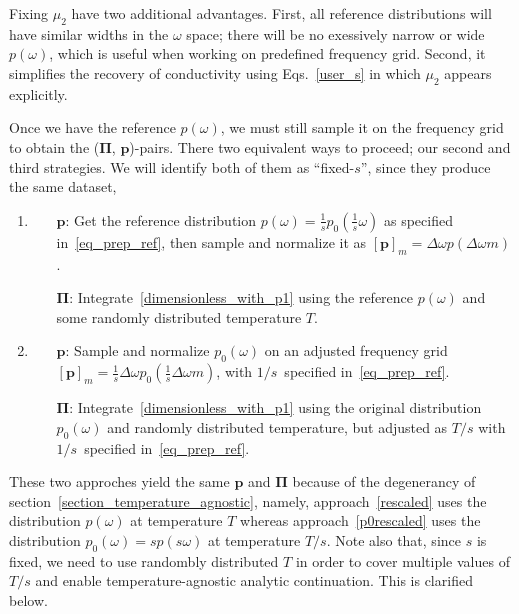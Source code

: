 \documentclass[notitlepage, 11pt, nofootinbib]{revtex4-1}
\renewcommand{\vec}[1]{\bm{#1}}
\begin{document}
Fixing $\mu_2$ have two additional advantages. First, all reference distributions will have similar widths in the $\omega$ space; there will be no exessively narrow or wide $p(\omega)$, which is useful when working on predefined frequency grid. Second, it simplifies the recovery of conductivity using Eqs.~\eqref{user_s} in which $\mu_2$ appears explicitly.

Once we have the reference $p(\omega)$, we must still sample it on the frequency grid to obtain the ($\vec \Pi$, $\vec p$)-pairs. There two equivalent ways to proceed; our second and third strategies. We will identify both of them as ``fixed-$s$'', since they produce the same dataset,
\begin{enumerate}[resume]
\item \label{rescaled}
\begin{itemize}
    \item[$\vec p$:] Get the reference distribution $p(\omega) = \tfrac{1}{s}p_0(\tfrac{1}{s}\omega)$ as specified in~\eqref{eq_prep_ref}, then sample and normalize it as $[\vec p]_m = \Delta\omega p(\Delta\omega m)$.
    \item[$\vec \Pi$:] Integrate~\eqref{dimensionless_with_p1} using the reference $p(\omega)$ and some randomly distributed temperature $T$.
\end{itemize}
\item \label{p0rescaled}
\begin{itemize}
    \item[$\vec p$:] Sample and normalize $p_0(\omega)$ on an adjusted frequency grid $[\vec p]_m = \frac{1}{s}\Delta\omega p_0(\frac{1}{s}\Delta\omega m)$, with $1/s$~specified in~\eqref{eq_prep_ref}.

    \item[$\vec \Pi$:] Integrate~\eqref{dimensionless_with_p1} using the original distribution $p_0(\omega)$ and randomly distributed temperature, but adjusted as $T/s$ with $1/s$~specified in~\eqref{eq_prep_ref}.
\end{itemize}
\end{enumerate}
These two approches yield the same $\vec p$ and $\vec \Pi$ because of the degenerancy of section~\ref{section_temperature_agnostic}, namely, approach~\ref{rescaled} uses the distribution $p(\omega)$ at temperature $T$ whereas approach~\ref{p0rescaled} uses the distribution $p_0(\omega)=sp(s\omega)$ at temperature $T/s$.
Note also that, since $s$ is fixed, we need to use randombly distributed $T$ in order to cover multiple values of $T/s$ and enable temperature-agnostic analytic continuation. This is clarified below.
\end{document}
